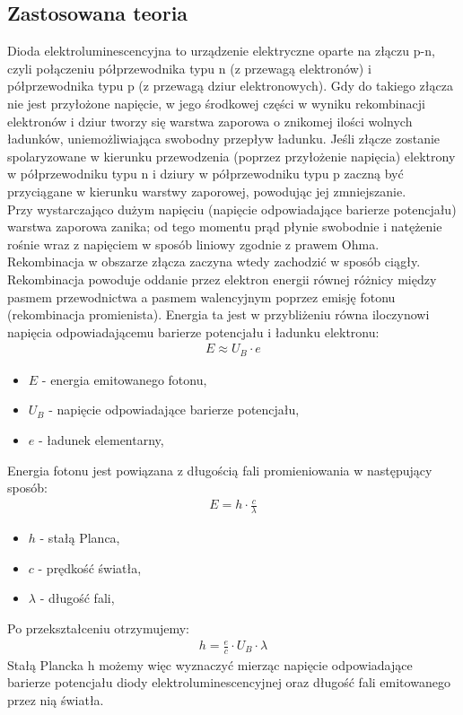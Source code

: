 \documentclass[11pt]{article}
\begin{document}
    \subsection*{Zastosowana teoria}
    Dioda elektroluminescencyjna to urządzenie elektryczne oparte na
    złączu p-n, czyli połączeniu półprzewodnika typu n (z przewagą elektronów) i
    półprzewodnika typu p (z przewagą dziur elektronowych). Gdy do takiego złącza nie
    jest przyłożone napięcie, w jego środkowej części w wyniku rekombinacji elektronów i
    dziur tworzy się warstwa zaporowa o znikomej ilości wolnych ładunków, uniemożliwiająca
    swobodny przepływ ładunku. Jeśli złącze zostanie spolaryzowane w kierunku przewodzenia
    (poprzez przyłożenie napięcia) elektrony w półprzewodniku typu n i dziury w półprzewodniku
    typu p zaczną być przyciągane w kierunku warstwy zaporowej, powodując jej zmniejszanie. \\
    \indent Przy wystarczająco dużym napięciu (napięcie odpowiadające barierze potencjału) warstwa zaporowa
    zanika; od tego momentu prąd płynie swobodnie i natężenie rośnie wraz z napięciem w sposób
    liniowy zgodnie z prawem Ohma. Rekombinacja w obszarze złącza zaczyna wtedy zachodzić w sposób
    ciągły. Rekombinacja powoduje oddanie przez elektron energii równej różnicy między pasmem
    przewodnictwa a pasmem walencyjnym poprzez emisję fotonu (rekombinacja promienista). Energia
    ta jest w przybliżeniu równa iloczynowi napięcia odpowiadającemu barierze potencjału i ładunku elektronu:
    \begin{gather*}
        E\approx U_B\cdot e
    \end{gather*}
    {\footnotesize
        \begin{itemize}
            \item[] $E$ - energia emitowanego fotonu,
            \item[] $U_B$ - napięcie odpowiadające barierze potencjału,
            \item[] $e$ - ładunek elementarny,
        \end{itemize}}
    \noindent Energia fotonu jest powiązana z długością fali promieniowania w następujący sposób:
    \begin{gather*}
        E=h\cdot\frac{c}{\lambda}
    \end{gather*}
    {\footnotesize
        \begin{itemize}
            \item[] $h$ - stałą Planca,
            \item[] $c$ - prędkość światła,
            \item[] $\lambda$ - długość fali,
        \end{itemize}}
    \noindent Po przekształceniu otrzymujemy:
    \begin{gather*}
        h=\frac{e}{c}\cdot U_B\cdot\lambda
    \end{gather*}
    \indent Stałą Plancka h możemy więc wyznaczyć mierząc
    napięcie odpowiadające barierze potencjału diody elektroluminescencyjnej
    oraz długość fali emitowanego przez nią światła.
\end{document}

